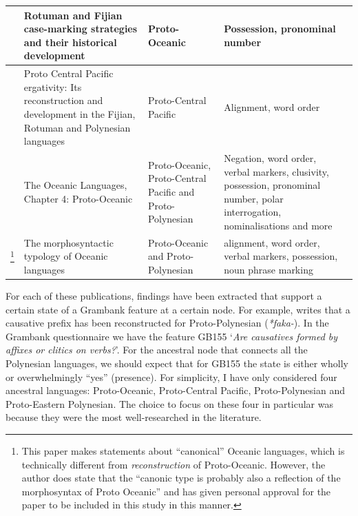 \documentclass[draft,10pt]{article} %
\begin{document}
\begin{longtable}{|p{3cm}|  p{5cm}| p{4cm} | p{3cm}  | p{3cm} |}
\citet{kikusawa2001rotuman} & Rotuman and Fijian case-marking strategies and their historical development  & Proto-Oceanic & Possession, pronominal number \\ \hline

\citet{kikusawa2002proto}  & Proto Central Pacific ergativity: Its reconstruction and development in the Fijian, Rotuman and Polynesian languages & Proto-Central Pacific   & Alignment, word order \\ \hline

\citet{lynchrosscrowley_proto_grammar_oceanic} & The Oceanic Languages, Chapter 4: Proto-Oceanic & Proto-Oceanic, Proto-Central Pacific and Proto-Polynesian & Negation, word order, verbal markers, clusivity, possession, pronominal number, polar interrogation, nominalisations and more \\ \hline

\citet{ross2004morphosyntactic}\footnote{This paper makes statements about ``canonical'' Oceanic languages, which is technically different from \emph{reconstruction} of Proto-Oceanic. However, the author does state that the ``canonic type is probably also a reflection of the morphosyntax of Proto Oceanic'' \citep[492]{ross2004morphosyntactic} and has given personal approval for the paper to be included in this study in this manner.}  & The morphosyntactic typology of Oceanic languages &  Proto-Oceanic and Proto-Polynesian  & alignment, word order, verbal markers, possession, noun phrase marking \\ \hline
\end{longtable}

For each of these publications, findings have been extracted that support a certain state of a Grambank feature at a certain node. For example, \citet[4]{marck2000_encyclo} writes that a causative prefix has been reconstructed for Proto-Polynesian (\emph{*faka-}). In the Grambank questionnaire we have the feature GB155 `\emph{Are causatives formed by affixes or clitics on verbs?}'. For the ancestral node that connects all the Polynesian languages, we should expect that for GB155 the state is either wholly or overwhelmingly ``yes'' (presence). For simplicity, I have only considered four ancestral languages: Proto-Oceanic, Proto-Central Pacific, Proto-Polynesian and Proto-Eastern Polynesian. The choice to focus on these four in particular was because they were the most well-researched in the literature. 

\end{document}
